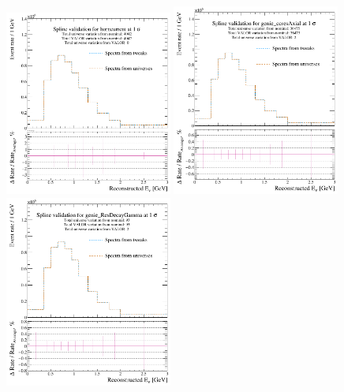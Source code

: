 \begin{figure}[h!]
    \includegraphics[width = 0.49\textwidth, height = 0.56184\textwidth]{figures-chap6/tweak_nsigma_nue/horncurrent_FluxUnisim_nuelikeCChigh_1sigma_horncurrent_FluxUnisim.png}
    \includegraphics[width = 0.49\textwidth]{figures-chap6/tweak_nsigma_nue/genie_ccresAxial_Genie_nuelikeCChigh_1sigma_genie_ccresAxial_Genie.png}
    \includegraphics[width = 0.49\textwidth]{figures-chap6/tweak_nsigma_nue/genie_ResDecayGamma_Genie_nuelikeCChigh_1sigma_genie_ResDecayGamma_Genie.png}

\end{figure}
